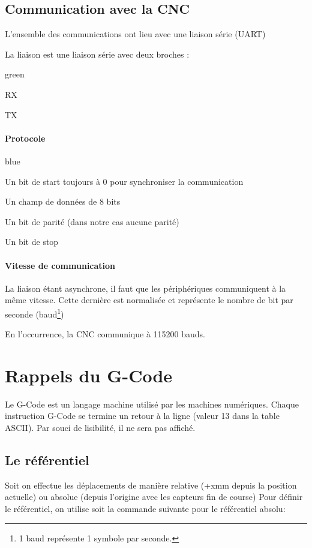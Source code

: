 \section{Communication avec la CNC}

L'ensemble des communications ont lieu avec une liaison série (UART)


La liaison  est une liaison série avec deux broches :

\begin{items}{green}{\Triangle}
   \item RX
   \item TX
\end{items}

\subsubsection{Protocole}

\begin{items}{blue}{\Circle}
   \item Un bit de start toujours à 0 pour synchroniser la communication
   \item Un champ de données de 8 bits
   \item Un bit de parité (dans notre cas aucune parité)
   \item Un bit de stop
\end{items}

\subsubsection{Vitesse de communication}

La liaison étant asynchrone, il faut que les périphériques communiquent à la même vitesse. Cette dernière est normalisée et représente le nombre de bit par seconde (baud\footnote{1 baud représente 1 symbole par seconde.})

En l’occurrence, la CNC communique à 115200 bauds.


\chapter{Rappels du G-Code}

Le G-Code est un langage machine utilisé par les machines numériques.
Chaque instruction G-Code se termine un retour à la ligne (valeur 13 dans la table ASCII). Par souci de lisibilité, il ne sera pas affiché.
\section{Le référentiel}
Soit on effectue les déplacements de manière relative (+xmm depuis la position actuelle) ou absolue (depuis l'origine avec les capteurs fin de course)
Pour définir le référentiel, on utilise soit la commande suivante pour le référentiel absolu:

